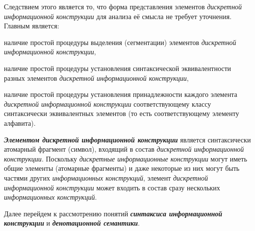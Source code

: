 Следствием этого является то, что форма представления элементов \textit{дискретной информационной конструкции} для анализа её смысла не требует уточнения.
Главным является:
\begin{textitemize}
    \item наличие простой процедуры выделения (сегментации) элементов \textit{\textit{дискретной информационной конструкции}},
    \item наличие простой процедуры установления синтаксической эквивалентности разных элементов \textit{дискретной информационной конструкции},
    \item наличие простой процедуры установления принадлежности каждого элемента \textit{дискретной информационной конструкции} соответствующему классу синтаксически эквивалентных элементов (то есть соответствующему элементу алфавита).
\end{textitemize}

\textbf{\textit{Элементом дискретной информационной конструкции}} является синтаксически атомарный фрагмент (символ), входящий в состав \textit{дискретной информационной конструкции}.
Поскольку \textit{дискретные информационные конструкции} могут иметь общие элементы (атомарные фрагменты) и даже некоторые из них могут быть частями других \textit{информационных конструкций}, элемент \textit{дискретной информационной конструкции} может входить в состав сразу нескольких \textit{информационных конструкций}.

Далее перейдем к рассмотрению понятий \textbf{\textit{синтаксиса информационной конструкции}} и \textbf{\textit{денотационной семантики}}.

